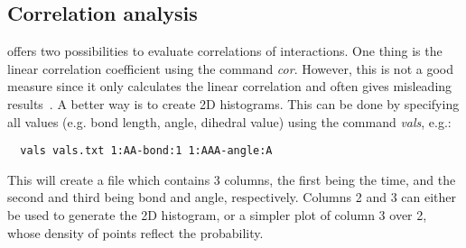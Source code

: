 \subsection{Correlation analysis}
 offers two possibilities to evaluate correlations of interactions. One thing is the linear correlation coefficient using the command \textit{cor}. However, this is not a good measure since it only calculates the linear correlation and often gives misleading results~\cite{Ruehle:2009.a}. A better way is to create 2D histograms. This can be done by specifying all values (e.g. bond length, angle, dihedral value) using the command \textit{vals}, e.g.:
\begin{verbatim}
  vals vals.txt 1:AA-bond:1 1:AAA-angle:A
\end{verbatim}
This will create a file which contains 3 columns, the first being the time, and the second and third being bond and angle, respectively. Columns 2 and 3 can either be used to generate the 2D histogram, or a simpler plot of column 3 over 2, whose density of points reflect the probability.
